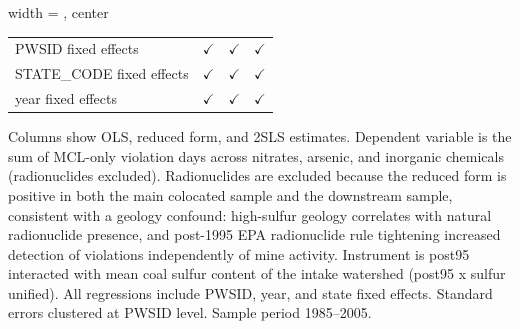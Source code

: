 \begin{table}[htbp]
\begin{adjustbox}{width = \textwidth, center}
\begin{tabular}{lccc}
          \\
         
         PWSID fixed effects                               & $\checkmark$  & $\checkmark$  & $\checkmark$\\   
         STATE\_CODE fixed effects                         & $\checkmark$  & $\checkmark$  & $\checkmark$\\   
         year fixed effects                                & $\checkmark$  & $\checkmark$  & $\checkmark$\\   
         
         \bottomrule
         
      \end{tabular}
      
      
      
   \end{adjustbox}
      {\tiny\linespread{1}\selectfont \par \raggedright 
   Columns show OLS, reduced form, and 2SLS estimates. Dependent variable is the sum of MCL-only violation days across nitrates, arsenic, and inorganic chemicals (radionuclides excluded). Radionuclides are excluded because the reduced form is positive in both the main colocated sample and the downstream sample, consistent with a geology confound: high-sulfur geology correlates with natural radionuclide presence, and post-1995 EPA radionuclide rule tightening increased detection of violations independently of mine activity. Instrument is post95 interacted with mean coal sulfur content of the intake watershed (post95 x sulfur unified). All regressions include PWSID, year, and state fixed effects. Standard errors clustered at PWSID level. Sample period 1985--2005.}
   
\end{table}


